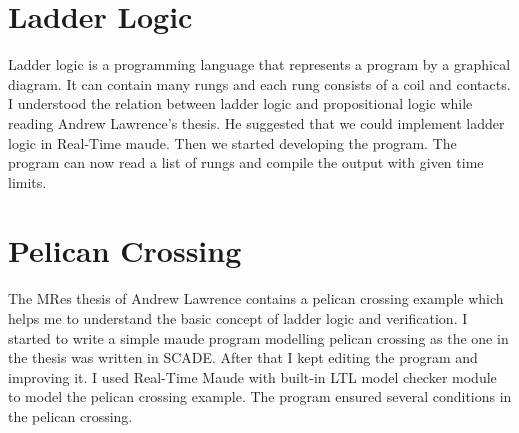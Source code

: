 \documentclass{article}
\begin{document}
\section{Ladder Logic}
Ladder logic is a programming language that represents a program by a graphical diagram. It can contain many rungs and each rung consists of a coil and contacts.
I understood the relation between ladder logic and propositional logic while reading Andrew Lawrence's thesis. He suggested that we could implement ladder logic in Real-Time maude. Then we started developing the program. The program can now read a list of rungs and compile the output with given time limits.
\section{Pelican Crossing}
The MRes thesis of Andrew Lawrence \cite{mres} contains a pelican crossing example which helps me to understand the basic concept of ladder logic and verification. I started to write a simple maude program modelling pelican crossing as the one in the thesis was written in SCADE.  After that I kept editing the program and improving it. I used Real-Time Maude with built-in LTL model checker module to model the pelican crossing example. The program ensured several  conditions in the pelican crossing.
\end{document}
